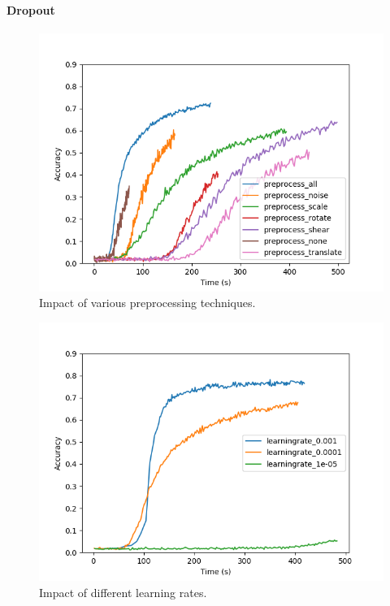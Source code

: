 \documentclass{article}
\begin{document}
\paragraph{Dropout}
\begin{figure}
\centering
    \includegraphics[width=\linewidth]{../Graphs/preprocess.png}
    \caption{Impact of various preprocessing techniques.}
    \label{fig:preprocess}
\end{figure}
\begin{figure}
    \centering
    \includegraphics[width=\linewidth]{../Graphs/learningrate.png}
    \caption{Impact of different learning rates.}
    \label{fig:learningrate}
\end{figure}
\end{document}
